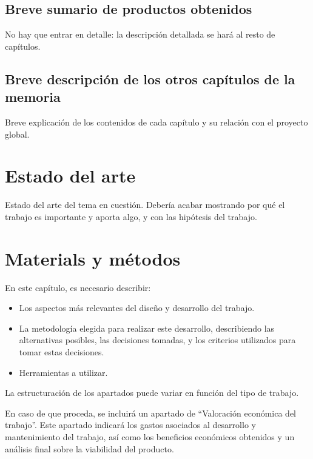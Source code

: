 \documentclass{uoc_memoria}
\begin{document}
\subsection{Breve sumario de productos obtenidos}

\begin{guidancebox}
No hay que entrar en detalle: la descripción detallada se hará al resto de capítulos.
\end{guidancebox}

\subsection{Breve descripción de los otros capítulos de la memoria}

\begin{guidancebox}
Breve explicación de los contenidos de cada capítulo y su relación con el proyecto global.
\end{guidancebox}

\clearpage
\section{Estado del arte}

\begin{guidancebox}
Estado del arte del tema en cuestión. Debería acabar mostrando por qué el trabajo es importante y aporta algo, y con las hipótesis del trabajo.
\end{guidancebox}

\clearpage
\section{Materials y métodos}

\begin{guidancebox}
En este capítulo, es necesario describir:
\begin{itemize}
  \item Los aspectos más relevantes del diseño y desarrollo del trabajo.
  \item La metodología elegida para realizar este desarrollo, describiendo las alternativas posibles, las decisiones tomadas, y los criterios utilizados para tomar estas decisiones.
  \item Herramientas a utilizar.
\end{itemize}

La estructuración de los apartados puede variar en función del tipo de trabajo.

En caso de que proceda, se incluirá un apartado de ``Valoración económica del trabajo''. Este apartado indicará los gastos asociados al desarrollo y mantenimiento del trabajo, así como los beneficios económicos obtenidos y un análisis final sobre la viabilidad del producto.
\end{guidancebox}
\end{document}
